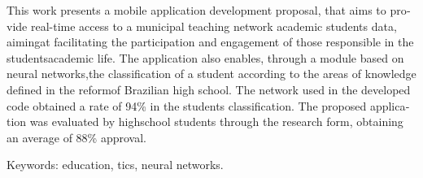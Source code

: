 \begin{resumo}[Abstract]
    \begin{otherlanguage}{english}
        This work presents a mobile application development proposal, that aims to provide real-time access to a municipal teaching network academic students data, aimingat facilitating the participation and engagement of those responsible in the studentsacademic life. The application also enables, through a module based on neural networks,the classification of a student according to the areas of knowledge defined in the reformof Brazilian high school. The network used in the developed code obtained a rate of 94\% in the students classification.  The proposed application was evaluated by highschool students through the research form, obtaining an average of 88\% approval.
        
        Keywords: education, tics, neural networks.
    \end{otherlanguage}
\end{resumo}